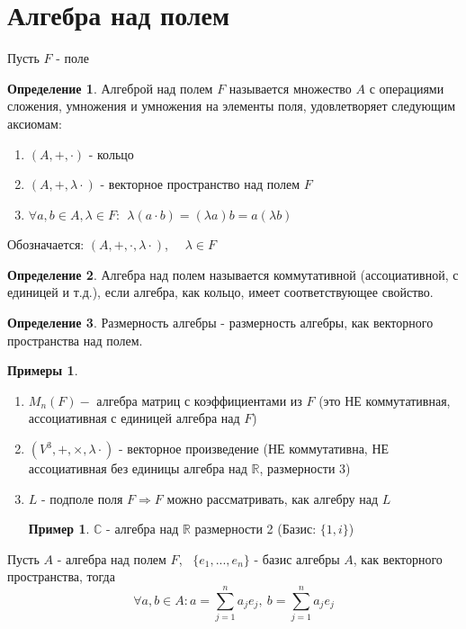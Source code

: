 \documentclass[a4paper, 12pt]{article}
\newcommand{\R}{\mathbb R}
\newcommand\tab[1][.5cm]{\hspace*{#1}}
\theoremstyle{definition}
\newtheorem*{definition}{Определение}
\newtheorem*{example}{Примеры}
\newtheorem*{example1}{Пример}
\begin{document}
  \section{Алгебра над полем}
  Пусть $F$ - поле 
  \begin{definition}
    Алгеброй над полем $F$ называется множество $A$  с операциями сложения, умножения и умножения на элементы поля, удовлетворяет следующим аксиомам:
    \begin{enumerate}
      \item $(A, +, \cdot)$ - кольцо
      \item $(A, +, \lambda \cdot)$ - векторное пространство над полем $F$
      \item $\forall a, b \in A, \lambda\in F: \ \ \lambda(a \cdot b) = (\lambda a)b = a(\lambda b)$    
    \end{enumerate}
    Обозначается: $(A, +, \cdot, \lambda \cdot)$, \ \ $\lambda\in F$ 
  \end{definition}
  \begin{definition}
    Алгебра над полем называется коммутативной (ассоциативной, с единицей и т.д.), если алгебра, как кольцо, имеет соответствующее свойство.
  \end{definition}
  \begin{definition}
    Размерность алгебры - размерность алгебры, как векторного пространства над полем.
  \end{definition} 
  \begin{example}\tab
    \begin{enumerate}
      \item $M_n(F) -$ алгебра матриц с коэффициентами из $F$ (это НЕ коммутативная, ассоциативная с единицей алгебра над $F$)
      \item $(V^3, +, \times, \lambda \cdot)$ - векторное произведение (НЕ коммутативна, НЕ ассоциативная без единицы алгебра над $\R$, размерности 3)
      \item $L$ - подполе поля $F \Longrightarrow F$ можно рассматривать, как алгебру над $L$  
      \begin{example1}
        $\mathbb{C}$ - алгебра над $\R$ размерности 2 (Базис: $\{1, i\}$) 
      \end{example1}
    \end{enumerate}
  \end{example}
  Пусть $A$ - алгебра над полем $F$, \ $\{e_1,...,e_n\}$ - базис алгебры $A$, как векторного пространства, тогда $$\forall a, b \in A: a = \sum \limits_{j=1}^na_je_j, \ b = \sum \limits_{j=1}^na_je_j$$ 
\end{document}
